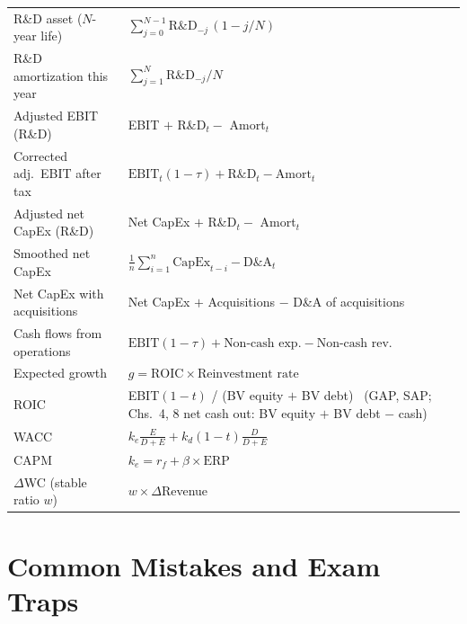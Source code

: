 \begin{center}
\begin{longtable}{@{}p{4.6cm}p{10.4cm}@{}}
R\&D asset ($N$-year life) & $\sum_{j=0}^{N-1}\text{R\&D}_{-j}\,(1-j/N)$\\
R\&D amortization this year & $\sum_{j=1}^{N}\text{R\&D}_{-j}/N$\\
Adjusted EBIT (R\&D) & EBIT $+$ R\&D$_t-$ Amort$_t$\\
Corrected adj.\ EBIT after tax & $\text{EBIT}_t(1-\tau)+\text{R\&D}_t-\text{Amort}_t$\\
Adjusted net CapEx (R\&D) & Net CapEx $+$ R\&D$_t-$ Amort$_t$\\
Smoothed net CapEx & $\frac1n\sum_{i=1}^n\text{CapEx}_{t-i}-\text{D\&A}_t$\\
Net CapEx with acquisitions & Net CapEx $+$ Acquisitions $-$ D\&A of acquisitions\\
Cash flows from operations & $\text{EBIT}(1-\tau)+\text{Non-cash exp.}-\text{Non-cash rev.}$\\
Expected growth & $g=\text{ROIC}\times\text{Reinvestment rate}$\\
ROIC & EBIT$(1-t)$ / (BV equity $+$ BV debt) \ {\footnotesize(GAP, SAP; Chs.\ 4, 8 net cash out: BV equity $+$ BV debt $-$ cash)}\\
WACC & $k_e\frac{E}{D+E}+k_d(1-t)\frac{D}{D+E}$\\
CAPM & $k_e=r_f+\beta\times\text{ERP}$\\
$\Delta$WC (stable ratio $w$) & $w\times\Delta$Revenue\\
\bottomrule
\end{longtable}
\end{center}

\section{Common Mistakes and Exam Traps}

